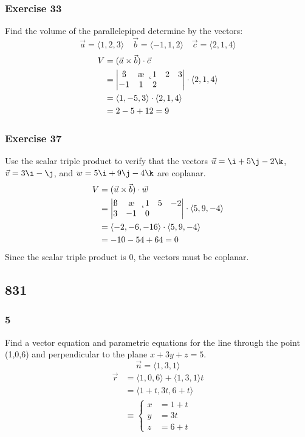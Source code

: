 \documentclass{math}
\begin{document}
\subsubsection*{Exercise 33}
Find the volume of the parallelepiped determine by the vectors:
\[ \vec{a} = \langle1,2,3\rangle \quad \vec{b} = \langle-1,1,2\rangle
  \quad \vec{c} = \langle2,1,4\rangle \]
\begin{align*}
  V &= (\vec{a}\times\vec{b})\cdot\vec{c} \\
  &= \begin{vmatrix}
    \i & \j & \k \\
    1 & 2 & 3 \\
    -1 & 1 & 2
  \end{vmatrix}\cdot\langle2,1,4\rangle \\
  &= \langle1,-5,3\rangle\cdot\langle2,1,4\rangle \\
  &= 2-5+12 = 9
\end{align*}

\subsubsection*{Exercise 37}
Use the scalar triple product to verify that the vectors \( \vec{u} = \i+5\j-
2\k \), \( \vec{v} = 3\i-\j \), and \( w = 5\i+9\j-4\k \) are coplanar.
\begin{align*}
  V &= (\vec{u}\times\vec{b})\cdot\vec{w} \\
  &= \begin{vmatrix}
    \i & \j & \k \\
    1 & 5 & -2 \\
    3 & -1 & 0
  \end{vmatrix}\cdot\langle5,9,-4\rangle \\
  &= \langle-2,-6,-16\rangle\cdot\langle5,9,-4\rangle \\
  &= -10-54+64 = 0
\end{align*}
Since the scalar triple product is 0, the vectors must be coplanar.

\subsection*{831}

\subsubsection*{5}
Find a vector equation and parametric equations for the line through the
point (1,0,6) and perpendicular to the plane \( x+3y+z = 5 \).
\[ \vec{n} = \langle1,3,1\rangle \]
\begin{align*}
  \vec{r} &= \langle1,0,6\rangle+\langle1,3,1\rangle t \\
  &= \langle1+t,3t,6+t\rangle \\
  &\equiv \begin{cases}
    x &= 1+t \\
    y &= 3t \\
    z &= 6+t
  \end{cases}
\end{align*}
\end{document}
